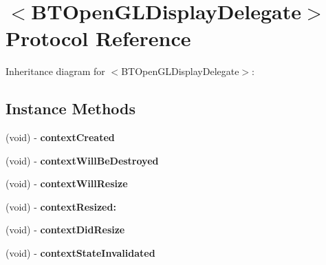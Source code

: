 \hypertarget{protocol_b_t_open_g_l_display_delegate-p}{\section{$<$B\+T\+Open\+G\+L\+Display\+Delegate$>$ Protocol Reference}
\label{protocol_b_t_open_g_l_display_delegate-p}
}


Inheritance diagram for $<$B\+T\+Open\+G\+L\+Display\+Delegate$>$\+:
\subsection*{Instance Methods}
\begin{DoxyCompactItemize}
\item 
\hypertarget{protocol_b_t_open_g_l_display_delegate-p_af73d49c93507c11a8c493419847538b2}{(void) -\/ {\bfseries context\+Created}}\label{protocol_b_t_open_g_l_display_delegate-p_af73d49c93507c11a8c493419847538b2}

\item 
\hypertarget{protocol_b_t_open_g_l_display_delegate-p_a0d5ccfccb0c26db27510ba53cdca7103}{(void) -\/ {\bfseries context\+Will\+Be\+Destroyed}}\label{protocol_b_t_open_g_l_display_delegate-p_a0d5ccfccb0c26db27510ba53cdca7103}

\item 
\hypertarget{protocol_b_t_open_g_l_display_delegate-p_a8708ba0f601a1a8296a97fb2ce11b2e2}{(void) -\/ {\bfseries context\+Will\+Resize}}\label{protocol_b_t_open_g_l_display_delegate-p_a8708ba0f601a1a8296a97fb2ce11b2e2}

\item 
\hypertarget{protocol_b_t_open_g_l_display_delegate-p_a5bd14c4a2d5b44d9a8184bc198146390}{(void) -\/ {\bfseries context\+Resized\+:}}\label{protocol_b_t_open_g_l_display_delegate-p_a5bd14c4a2d5b44d9a8184bc198146390}

\item 
\hypertarget{protocol_b_t_open_g_l_display_delegate-p_a94b0b8567b491e30c30fd9cac15d658d}{(void) -\/ {\bfseries context\+Did\+Resize}}\label{protocol_b_t_open_g_l_display_delegate-p_a94b0b8567b491e30c30fd9cac15d658d}

\item 
\hypertarget{protocol_b_t_open_g_l_display_delegate-p_a080f1f44f2f96a08d6eee869342bf5c1}{(void) -\/ {\bfseries context\+State\+Invalidated}}\label{protocol_b_t_open_g_l_display_delegate-p_a080f1f44f2f96a08d6eee869342bf5c1}


\end{DoxyCompactItemize}

